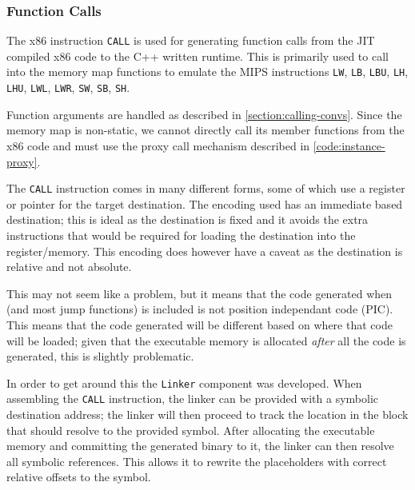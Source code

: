 \subsubsection{Function Calls}

The x86 instruction \texttt{CALL} \cite{x86-call} is used for generating function calls from the JIT compiled x86 code to the C++ written runtime. This is primarily used to call into the memory map functions to emulate the MIPS instructions \texttt{LW}, \texttt{LB}, \texttt{LBU}, \texttt{LH}, \texttt{LHU}, \texttt{LWL}, \texttt{LWR}, \texttt{SW}, \texttt{SB}, \texttt{SH}.

Function arguments are handled as described in \autoref{section:calling-convs}. Since the memory map is non-static, we cannot directly call its member functions from the x86 code and must use the proxy call mechanism described in \autoref{code:instance-proxy}.

The \texttt{CALL} instruction comes in many different forms, some of which use a register or pointer for the target destination. The encoding used has an immediate based destination; this is ideal as the destination is fixed and it avoids the extra instructions that would be required for loading the destination into the register/memory. This encoding does however have a caveat as the destination is relative and not absolute.

This may not seem like a problem, but it means that the code generated when  (and most jump functions) is included is not position independant code (PIC). This means that the code generated will be different based on where that code will be loaded; given that the executable memory is allocated \textit{after} all the code is generated, this is slightly problematic.

In order to get around this the \texttt{Linker} component was developed. When assembling the \texttt{CALL} instruction, the linker can be provided with a symbolic destination address; the linker will then proceed to track the location in the block that should resolve to the provided symbol. After allocating the executable memory and committing the generated binary to it, the linker can then resolve all symbolic references. This allows it to rewrite the placeholders with correct relative offsets to the symbol.